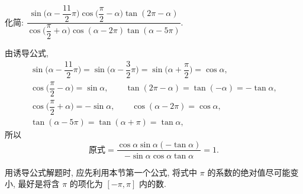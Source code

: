 \begin{example}
    化简: $\dfrac{\sin\biggl(\alpha-\dfrac{11}2\pi\biggr)
        \cos\biggl(\dfrac{\pi}2-\alpha\biggr)
        \tan(2\pi-\alpha)}{\cos\biggl(\dfrac{\pi}2+\alpha\biggr)
        \cos(\alpha-2\pi)\tan(\alpha-5\pi)}$.
\end{example}
\begin{solution}
    由诱导公式,
    \[\begin{gathered}
        \sin\biggl(\alpha-\dfrac{11}2\pi\biggr)
        = \sin\biggl(\alpha-\dfrac{3}2\pi\biggr)
        = \sin\biggl(\alpha+\dfrac{\pi}2\biggr)
        = \cos\alpha,\\
        \cos\biggl(\dfrac{\pi}2-\alpha\biggr)= \sin\alpha,\qquad
        \tan(2\pi-\alpha)= \tan(-\alpha)= -\tan\alpha,\\
        \cos\biggl(\dfrac{\pi}2+\alpha\biggr)= -\sin\alpha,\qquad
        \cos(\alpha-2\pi)= \cos\alpha,\\
        \tan(\alpha-5\pi)= \tan(\alpha+\pi)= \tan\alpha,
    \end{gathered}\]
    所以
    \[\text{原式}= \frac{\cos\alpha\sin\alpha(-\tan\alpha)}{
        -\sin\alpha\cos\alpha\tan\alpha}= 1.\]
\end{solution}

    用诱导公式解题时, 应先利用本节第一个公式, 将式中 $\pi$ 的系数的绝对值尽可能变小, 最好是将含 $\pi$ 的项化为 $[-\pi,\pi]$ 内的数.


